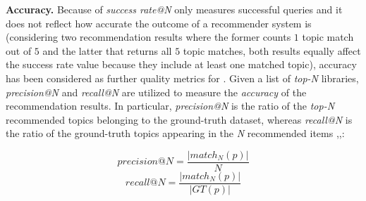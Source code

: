 \noindent \textbf{Accuracy.} Because of \emph{success rate@N} only measures successful queries and it does not reflect how accurate the outcome of a recommender system is
(\eg considering two recommendation results where the former counts $1$ topic match out of $5$ and the latter that returns all $5$ topic matches,  both results equally affect the success rate value because they include at least one matched topic), accuracy has been considered as further quality metrics for \TF. Given a list of \emph{top-N} libraries, \emph{precision@N} and \emph{recall@N} are utilized to measure the \emph{accuracy} of the recommendation results. In particular,  \emph{precision@N} is the ratio of the \emph{top-N} recommended topics belonging to the ground-truth dataset, whereas \emph{recall@N} is the ratio of the ground-truth topics appearing in the \emph{N} recommended items \cite{Nguyen:2019:FRS:3339505.3339636},\cite{DiNoia:2012:LOD:2362499.2362501},\cite{Davis:2006:RPR:1143844.1143874}:



\begin{equation} \label{eqn:Precision}
precision@N = \frac{ \left | match_{N}(p) \right | }{N}
\end{equation}
\begin{equation} \label{eqn:Recall}
recall@N = \frac{ \left | match_{N}(p) \right | }{\left | GT(p) \right |}
\end{equation}

